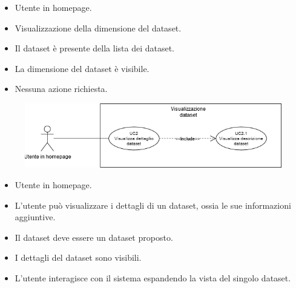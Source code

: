     \UCdsc
    { %
        \begin{itemize}
            \item Utente in homepage.
        \end{itemize}
    }
    { %
        \begin{itemize}
            \item Visualizzazione della dimensione del dataset.
        \end{itemize}
    }
    { %
        \begin{itemize}
            \item Il dataset è presente della lista dei dataset.
        \end{itemize}
    }
    { %
        \begin{itemize}
            \item La dimensione del dataset è visibile.
        \end{itemize}
    }
    { %
        \begin{itemize}
            \item Nessuna azione richiesta.
        \end{itemize}
    }


    \begin{figure}[h!]
        \centering
        \includegraphics[scale=0.6]{template/images/UC2.png}
        \caption{}
    \end{figure}
    \UCdsc
    { %
        \begin{itemize}
            \item Utente in homepage.
        \end{itemize}
    }
    { %
        \begin{itemize}
            \item  L'utente può visualizzare i dettagli di un dataset, ossia le sue informazioni aggiuntive.
        \end{itemize}
    }
    { %
        \begin{itemize}
            \item Il dataset deve essere un dataset proposto.
        \end{itemize}
    }
    { %
        \begin{itemize}
            \item I dettagli del dataset sono visibili.
        \end{itemize}
    }
    { %
        \begin{itemize}
            \item L'utente interagisce con il sistema espandendo la vista del singolo dataset.
        \end{itemize}
    }
    

